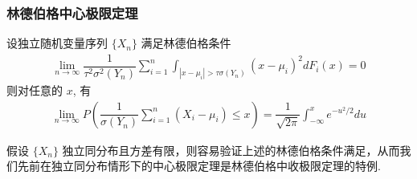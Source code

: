\begin{frame}
	\frametitle{林德伯格中心极限定理}
	\begin{thm}
		设独立随机变量序列 $\{X_n\}$ 满足林德伯格条件
		\begin{eqnarray*}%
			\lim_{n\rightarrow\infty} \dfrac{1}{\tau^2\sigma^2(Y_n)}\sum_{i=1}^n\int_{|x-\mu_i|>\tau\sigma(Y_n)}(x-\mu_i)^2dF_i(x)=0
		\end{eqnarray*} 则对任意的 $x$, 有
		\begin{eqnarray*}
			\lim_{n\rightarrow\infty}P(\dfrac{1}{\sigma(Y_n)}\sum_{i=1}^n(X_i-\mu_i)\le x)=\dfrac{1}{\sqrt{2\pi}}\int_{-\infty}^xe^{-u^2/2}du
		\end{eqnarray*}
	\end{thm}
	\pause
	\begin{rmk}
		假设 $\{X_n\}$ 独立同分布且方差有限，则容易验证上述的林德伯格条件满足，从而我们先前在独立同分布情形下的中心极限定理是林德伯格中收极限定理的特例.
	\end{rmk}
\end{frame}

